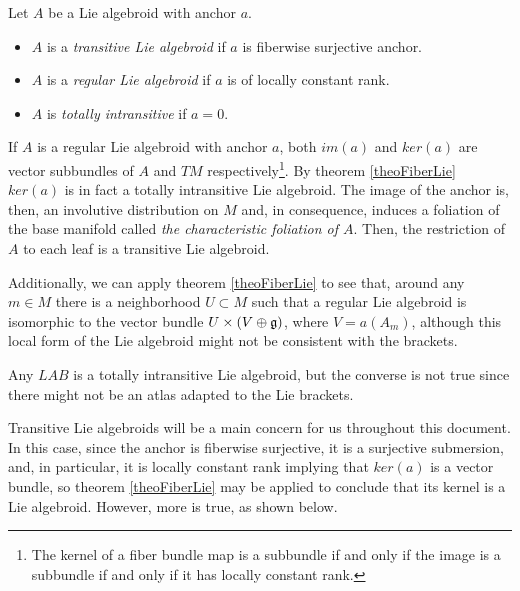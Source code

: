 \begin{definition}\label{definitionTransitiveRegularALgebroids}
    Let $A$ be a Lie algebroid with anchor $a$.
    
    \begin{itemize}
    
    \item $A$ is a \emph{transitive Lie algebroid} if $a$ is fiberwise surjective anchor.
    
    \item $A$ is a \emph{regular Lie algebroid} if $a$ is of locally constant rank.
    
    \item $A$ is \emph{totally intransitive} if $a = 0$.
    
    \end{itemize}
    
\end{definition}

\begin{remark}
If $A$ is a regular Lie algebroid with anchor $a$, both $im(a)$ and $ker(a)$ are vector subbundles of $A$ and $TM$ respectively\footnote{The kernel of a fiber bundle map is a subbundle if and only if the image is a subbundle if and only if it has locally constant rank.}. By theorem \ref{theoFiberLie} $ker(a)$ is in fact a totally intransitive Lie algebroid. The image of the anchor is, then, an involutive distribution on $M$ and, in consequence, induces a foliation of the base manifold called \emph{the characteristic foliation of $A$}. Then, the restriction of $A$ to each leaf is a transitive Lie algebroid.

Additionally, we can apply theorem \ref{theoFiberLie} to see that, around any $m \in M$ there is a neighborhood $U \subset M$ such that a regular Lie algebroid is isomorphic to the vector bundle $U \times (V \oplus \mathfrak{g})$, where $V = a(A_m)$, although this local form of the Lie algebroid might not be consistent with the brackets.%
\end{remark}

\begin{remark}
Any $LAB$ is a totally intransitive Lie algebroid, but the converse is not true since there might not be an atlas adapted to the Lie brackets.
\end{remark}

Transitive Lie algebroids will be a main concern for us throughout this document. In this case, since the anchor is fiberwise surjective,
 it is a surjective submersion, and, in particular, it is locally constant rank implying that $ker(a)$ is a vector bundle, so theorem \ref{theoFiberLie} may be applied to conclude that its kernel is a Lie algebroid. However, more is true, as shown below.

